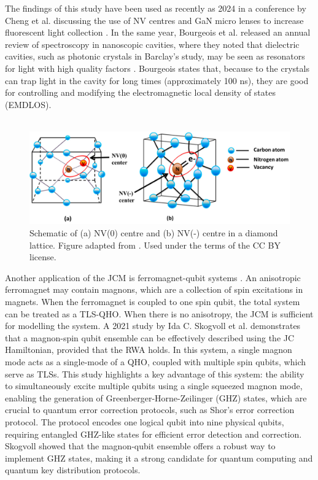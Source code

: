 \documentclass[12pt,a4paper]{article}
\begin{document}
The findings of this study have been used as recently as 2024 in a conference by Cheng et al. discussing the use of NV centres and GaN micro lenses to increase fluorescent light collection \cite{Context2024_NVcentre_conference}. In the same year, Bourgeois et al. released an annual review of  spectroscopy in nanoscopic cavities, where they noted that dielectric cavities, such as photonic crystals in Barclay's study, may be seen as resonators for light with high quality factors \cite{Context2024_NVcentre_review}. Bourgeois states that, because to the crystals can trap light in the cavity for long times (approximately 100 ns), they are good for controlling and modifying the electromagnetic local density of states (EMDLOS).\\
\\
\begin{figure}[h]
    \centering
    \includegraphics[scale=1.5]{nv_centre}
    \caption{Schematic of (a) NV(0) centre and (b) NV(-) centre in a diamond lattice. Figure adapted from \cite{Image-NV_centres}. Used under the terms of the CC BY license.}
    \label{fig:nv_centre}
\end{figure}

Another application of the JCM is ferromagnet-qubit systems \cite{General2024-JC_overview}. An anisotropic ferromagnet may contain magnons, which are a collection of spin excitations in magnets. When the ferromagnet is coupled to one spin qubit, the total system can be treated as a TLS-QHO. When there is no anisotropy, the JCM is sufficient for modelling the system. A 2021 study by Ida C. Skogvoll et al. demonstrates that a magnon-spin qubit ensemble can be effectively described using the JC Hamiltonian, provided that the RWA holds. In this system, a single magnon mode acts as a single-mode of a QHO, coupled with multiple spin qubits, which serve as TLSs. This study highlights a key advantage of this system: the ability to simultaneously excite multiple qubits using a single squeezed magnon mode, enabling the generation of Greenberger-Horne-Zeilinger (GHZ) states, which are crucial to quantum error correction protocols, such as Shor's error correction protocol. The protocol encodes one logical qubit into nine physical qubits, requiring entangled GHZ-like states for efficient error detection and correction. Skogvoll showed that the magnon-qubit ensemble offers a robust way to implement GHZ states, making it a strong candidate for quantum computing and quantum key distribution protocols.
\end{document}
